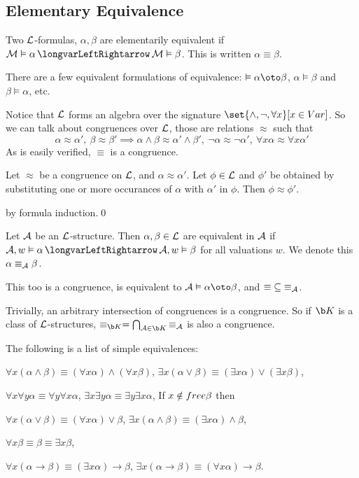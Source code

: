 \subsection{Elementary Equivalence}

\bdefn

    Two ${\cal L}$-formulas, $\alpha,\beta$ are {\emphcolor elementarily equivalent} if $\c M\vDash\alpha\iff\c M\vDash\beta$.
    This is written $\alpha\equiv\beta$.

\edefn

There are a few equivalent formulations of equivalence: $\vDash\alpha\oto\beta$, $\alpha\vDash\beta$ and $\beta\vDash\alpha$, etc.

Notice that ${\cal L}$ forms an algebra over the signature $\set{{\land},{\neg},{\forall x}}[x\in\Var]$.
So we can talk about congruences over ${\cal L}$, those are relations $\approx$ such that
$$ \alpha\approx\alpha',\ \beta\approx\beta' \implies \alpha\land\beta\approx\alpha'\land\beta',\ \neg\alpha\approx\neg\alpha',\ \forall x\alpha\approx\forall x\alpha' $$
As is easily verified, $\equiv$ is a congruence.

\blemm[title=The Replacement Lemma]

    Let $\approx$ be a congruence on ${\cal L}$, and $\alpha\approx\alpha'$.
    Let $\phi\in{\cal L}$ and $\phi'$ be obtained by substituting one or more occurances of $\alpha$ with $\alpha'$ in $\phi$.
    Then $\phi\approx\phi'$.

\elemm

\Proof by formula induction.\qed

\bdefn

    Let ${\cal A}$ be an ${\cal L}$-structure.
    Then $\alpha,\beta\in{\cal L}$ are {\emphcolor equivalent in ${\cal A}$} if $\c A,w\vDash\alpha\iff\c A,w\vDash\beta$ for all valuations $w$.
    We denote this $\alpha\equiv_{{\cal A}}\beta$.

\edefn

This too is a congruence, is equivalent to $\c A\vDash\alpha\oto\beta$, and ${\equiv}\subseteq{\equiv}_{{\cal A}}$.

Trivially, an arbitrary intersection of congruences is a congruence.
So if $\b K$ is a class of ${\cal L}$-structures, $\equiv_{\b K}=\bigcap_{\c A\in\b K}{\equiv}_{\c A}$ is also a congruence.

The following is a list of simple equivalences:
\benum
    \item $\forall x(\alpha\land\beta)\equiv(\forall x\alpha)\land(\forall x\beta)$, $\exists x(\alpha\lor\beta)\equiv(\exists x\alpha)\lor(\exists x\beta)$,
    \item $\forall x\forall y\alpha\equiv\forall y\forall x\alpha$, $\exists x\exists y\alpha\equiv\exists y\exists x\alpha$,
    \mtext If $x\notin{\sl free}\beta$ then
    \item $\forall x(\alpha\lor\beta)\equiv(\forall x\alpha)\lor\beta$, $\exists x(\alpha\land\beta)\equiv(\exists x\alpha)\land\beta$,
    \item $\forall x\beta\equiv\beta\equiv\exists x\beta$,
    \item $\forall x(\alpha\to\beta)\equiv(\exists x\alpha)\to\beta$, $\exists x(\alpha\to\beta)\equiv(\forall x\alpha)\to\beta$.
\eenum

